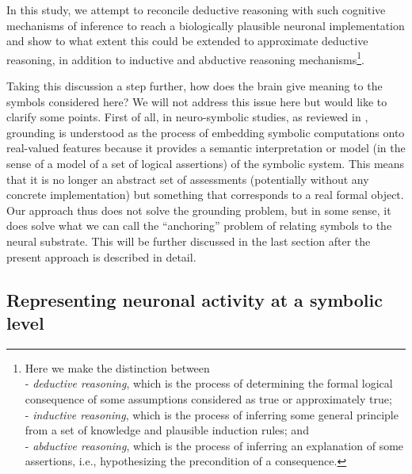 \documentclass[sn-mathphys]{sn-jnl}
\begin{document}
In this study, we attempt to reconcile deductive reasoning with such cognitive mechanisms of inference to reach a biologically plausible neuronal implementation and show to what extent this could be extended to approximate deductive reasoning, in addition to inductive and abductive reasoning mechanisms\footnote{Here we make the distinction between
\\- {\em deductive reasoning}, which is the process of determining the formal logical consequence of some assumptions considered as true or approximately true;
\\- {\em inductive reasoning}, which is the process of inferring some general principle from a set of knowledge and plausible induction rules; and
\\- {\em abductive reasoning}, which is the process of inferring an explanation of some assertions, i.e., hypothesizing the precondition of a consequence.}.

Taking this discussion a step further, how does the brain give meaning to the symbols considered here? We will not address this issue here but would like to clarify some points. First of all, in neuro-symbolic studies, as reviewed in \cite{garcez_neurosymbolic_2020}, grounding is understood as the process of embedding symbolic computations onto real-valued features \cite{badreddine_logic_2021} because it provides a semantic interpretation or model (in the sense of a model of a set of logical assertions) of the symbolic system. This means that it is no longer an abstract set of assessments (potentially without any concrete implementation) but something that corresponds to a real formal object. 
Our approach thus does not solve the grounding problem, but in some sense, it does solve what we can call the ``anchoring'' problem of relating symbols to the neural substrate. This will be further discussed in the last section after the present approach is described in detail.


\subsection{Representing neuronal activity at a symbolic level}
\end{document}
